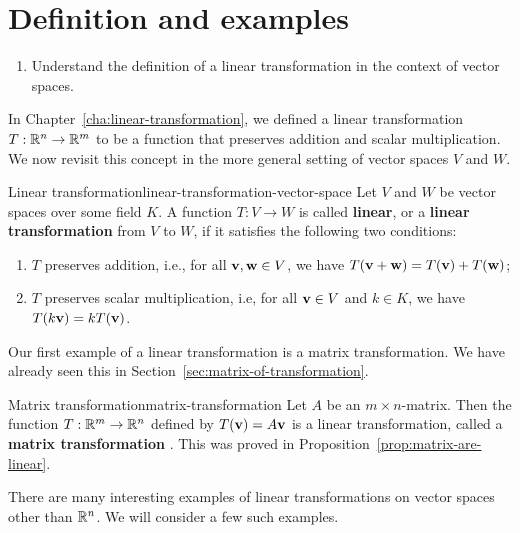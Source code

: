\section{Definition and examples}

\begin{outcome}
  \begin{enumerate}
  \item Understand the definition of a linear transformation in the
    context of vector spaces.
  \end{enumerate}
\end{outcome}

In Chapter~\ref{cha:linear-transformation}, we defined a linear
transformation $T:\mathbb{R}^n\to\mathbb{R}^m$ to be a function that preserves
addition and scalar multiplication. We now revisit this concept in the
more general setting of vector spaces $V$ and $W$.

\begin{definition}{Linear transformation}{linear-transformation-vector-space}
  Let $V$ and $W$ be vector spaces over some field $K$. A function
  $T: V \to W$ is called \textbf{linear}, or a \textbf{linear
    transformation}%
   from $V$ to $W$, if
  it satisfies the following two conditions:
  \begin{enumerate}
  \item $T$ preserves addition, i.e., for all\/
    $\mbox{\bf v},\mbox{\bf w}\in V$, we have
    $T(\mbox{\bf v}+\mbox{\bf w}) = T(\mbox{\bf v}) + T(\mbox{\bf w})$;
  \item $T$ preserves scalar multiplication, i.e, for all\/
    $\mbox{\bf v}\in V$ and $k\in K$, we have
    $T(k\mbox{\bf v}) = kT(\mbox{\bf v})$.
  \end{enumerate}
\end{definition}

Our first example of a linear transformation is a matrix
transformation. We have already seen this in
Section~\ref{sec:matrix-of-transformation}.

\begin{example}{Matrix transformation}{matrix-transformation}
  Let $A$ be an $m\times n$-matrix. Then the function $T:\mathbb{R}^m\to\mathbb{R}^n$
  defined by $T(\mbox{\bf v})=A\mbox{\bf v}$ is a linear transformation,
  called a \textbf{matrix transformation}%
  . This was proved in
  Proposition~\ref{prop:matrix-are-linear}.
\end{example}

There are many interesting examples of linear transformations on
vector spaces other than $\mathbb{R}^n$. We will consider a few such examples.


